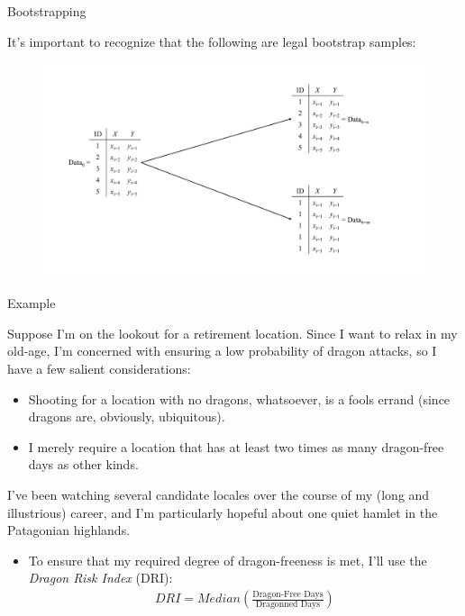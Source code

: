 \documentclass{beamer}
\newcommand{\va}[0]{\vspace{12pt}}
\newcommand{\vb}[0]{\vspace{6pt}}
\begin{document}
\begin{frame}{Bootstrapping}
  
  It's important to recognize that the following are legal bootstrap samples:
  
  \vspace{-12pt}
  
  \begin{figure}
    \begin{center}
      \includegraphics[width=\textwidth]{figures/perverseBootstrappingDiagram.pdf}
    \end{center}
  \end{figure}
  
\end{frame}



\begin{frame}[shrink = 5]{Example}
  
  Suppose I'm on the lookout for a retirement location. Since I want
  to relax in my old-age, I'm concerned with ensuring a low
  probability of dragon attacks, so I have a few salient
  considerations: \vb
  \begin{itemize}
    \item Shooting for a location with no dragons, whatsoever, is a
      fools errand (since dragons are, obviously, ubiquitous).
      \vb
    \item I merely require a location that has at least two times as many
      dragon-free days as other kinds.
  \end{itemize}
  \va
  I've been watching several candidate locales over the course of my
  (long and illustrious) career, and I'm particularly hopeful about
  one quiet hamlet in the Patagonian highlands.
  \vb
  \begin{itemize}
  \item To ensure that my required degree of dragon-freeness is met,
    I'll use the \emph{Dragon Risk Index} (DRI):
    \begin{align*}
      DRI = \textit{Median}\left( \frac{\text{Dragon-Free Days}}{\text{Dragonned Days}} \right)
    \end{align*}
  \end{itemize}
  
\end{frame}
\end{document}
